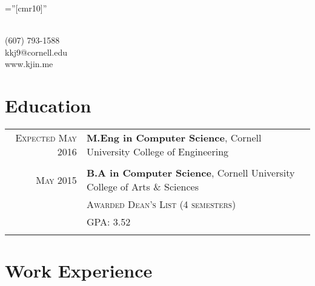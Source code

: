 \documentclass[a4paper,10pt]{article} %
\begin{document}
\pagestyle{empty} %

\font\fb=''[cmr10]'' %


\par{\\
\smallskip
(607) 793-1588\\
kkj9@cornell.edu\\
www.kjin.me\bigskip\par}


\section{Education}

\begin{tabular}{rp{11.5cm}}
\textsc{Expected May 2016} & \textbf{M.Eng in Computer Science}, Cornell University College of Engineering\\
\multicolumn{2}{c}{} \\


\textsc{May 2015} & \textbf{B.A in Computer Science}, Cornell University College of Arts \& Sciences\\
& \textsc{Awarded Dean's List (4 semesters)}\\
& \textsc{GPA}: 3.52\\
\multicolumn{2}{c}{} \\

\end{tabular}


\section{Work Experience}
\end{document}
